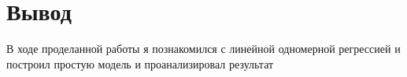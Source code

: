 \chapter{Вывод}
\label{ch:chap3}

В ходе проделанной работы я познакомился с линейной одномерной регрессией и построил простую модель и проанализировал результат




\endinput